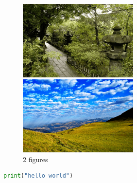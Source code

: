 \begin{figure}[H]
\begin{minipage}{0.5\hsize}
    \centering
    \includegraphics[width=6cm]{./sample/1.png}
\end{minipage}
\begin{minipage}{0.5\hsize}
    \centering
    \includegraphics[width=6cm]{./sample/2.png}
\end{minipage}
\caption{2 figures \label{fig:2fig}}
\end{figure}

\begin{lstlisting}[language=python,caption=hello code \label{src:hello}]
    print("hello world")
\end{lstlisting}
